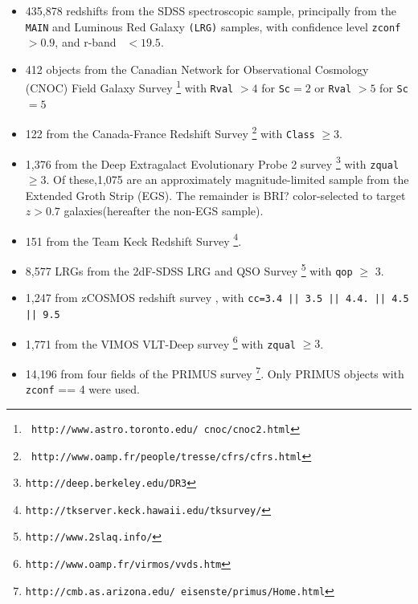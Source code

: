 \documentclass[preprint]{aastex}
\begin{document}
\begin{itemize} 

    \item 435,878 redshifts from the SDSS spectroscopic sample,
principally from the \texttt{MAIN} and Luminous Red Galaxy \texttt{(LRG)}
samples, with confidence level \texttt{zconf}$ > 0.9$, and r-band
\cmodelmag\ $ <19.5$.


    \item 412 objects from the Canadian Network for Observational
Cosmology (CNOC) Field Galaxy Survey \cite[CNOC2;][]{yee00}\footnote{\tt
http://www.astro.toronto.edu/~cnoc/cnoc2.html} with \texttt{Rval} $>4$
for \texttt{Sc}$=2$ or \texttt{Rval} $> 5$ for \texttt{Sc}$=5$

    \item 122 from the Canada-France Redshift
Survey \cite[CFRS;][]{lilly95}\footnote{\tt
http://www.oamp.fr/people/tresse/cfrs/cfrs.html} with \texttt{Class} $\geq 3$.

    \item 1,376 from the Deep Extragalact Evolutionary Probe 2 survey
\citep[DEEP2;][]{weiner05}\footnote{\tt http://deep.berkeley.edu/DR3}
with \texttt{zqual} $\geq 3$. 
Of these,1,075 are an approximately magnitude-limited sample from the Extended Groth Strip (EGS).
The remainder is BRI? color-selected to target $z>0.7$ galaxies(hereafter the non-EGS sample). 

    \item 151 from the Team Keck Redshift Survey \cite[TKRS;][]{wirth04}\footnote{\tt http://tkserver.keck.hawaii.edu/tksurvey/}.

    \item 8,577 LRGs from the 2dF-SDSS LRG and QSO Survey \cite[2SLAQ;][]{cannon06}\footnote{\tt http://www.2slaq.info/} with \texttt{qop} $\geq$ 3.

    \item  1,247 from zCOSMOS redshift survey \cite{lilly07}, with  \texttt{cc=3.4 || 3.5 || 4.4.  || 4.5 || 9.5}
    
    \item 1,771 from the VIMOS VLT-Deep survey \cite[VVDS;][]{garilli08}\footnote{\tt http://www.oamp.fr/virmos/vvds.htm} with \texttt{zqual} $\geq 3$.

    \item 14,196 from four fields of the PRIMUS survey \cite[PRIMUS;][]{coil10}\footnote{\tt http://cmb.as.arizona.edu/~eisenste/primus/Home.html}.  Only PRIMUS objects with \texttt{zconf} == 4 were used.      
\end{itemize}
\end{document}

